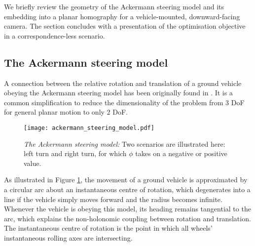 \documentclass[letterpaper, 10 pt, conference]{ieeeconf}  %
\begin{document}
We briefly review the geometry of the Ackermann steering model and its embedding into a planar homography for a vehicle-mounted, downward-facing camera. The section concludes with a presentation of the optimisation objective in a correspondence-less scenario.

\subsection{The Ackermann steering model}

A connection between the relative rotation and translation of a ground vehicle obeying the Ackermann steering model has been originally found in \cite{scaramuzza2009real}. It is a common simplification to reduce the dimensionality of the problem from 3 DoF for general planar motion to only 2 DoF.
%
\begin{figure}[b]
	\center
	\texttt{[image: ackermann\_steering\_model.pdf]} 
	\caption{\textit{The Ackermann steering model:} Two scenarios are illustrated here: left turn and right turn, for which $\phi$ takes on a negative or positive value.}
	\label{Ackermann Steering Model}
\end{figure}
%
As illustrated in Figure \ref{Ackermann Steering Model}, the movement of a ground vehicle is approximated by a circular arc about an instantaneous centre of rotation, which degenerates into a line if the vehicle simply moves forward and the radius becomes infinite. Whenever the vehicle is obeying this model, its heading remains tangential to the arc, which explains the non-holonomic coupling between rotation and translation. The instantaneous centre of rotation is the point in which all wheels' instantaneous rolling axes are intersecting.
\end{document}
